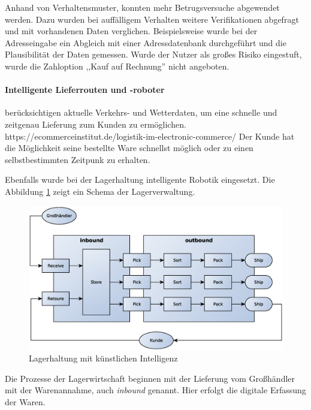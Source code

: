 Anhand von Verhaltensmuster, konnten mehr Betrugsversuche abgewendet werden. Dazu wurden bei auffälligem Verhalten weitere Verifikationen abgefragt und mit vorhandenen Daten verglichen. Beispielsweise wurde bei der Adresseingabe ein Abgleich mit einer Adressdatenbank durchgeführt und die Plausibilität der Daten gemessen. Wurde der Nutzer als großes Risiko eingestuft, wurde die Zahloption ,,Kauf auf Rechnung'' nicht angeboten.

\paragraph{Intelligente Lieferrouten und -roboter} berücksichtigen aktuelle Verkehrs- und Wetterdaten, um eine schnelle und zeitgenau Lieferung zum Kunden zu ermöglichen.
https://ecommerceinstitut.de/logistik-im-electronic-commerce/
Der Kunde hat die Möglichkeit seine bestellte Ware schnellst möglich oder zu einen selbstbestimmten Zeitpunk zu erhalten.\vspace{0.2cm}

Ebenfalls wurde bei der Lagerhaltung intelligente Robotik eingesetzt. Die Abbildung \ref{img:logistics_schema_in_e__commerce} zeigt ein Schema der Lagerverwaltung.

\begin{figure}[!ht]
	\centering
	\includegraphics[width=\linewidth]{images/logistics-ecommerce.eps}
	\caption{Lagerhaltung mit künstlichen Intelligenz}
	\label{img:logistics_schema_in_e__commerce}
\end{figure}

Die Prozesse der Lagerwirtschaft beginnen mit der Lieferung vom Großhändler mit der Warenannahme, auch \textit{inbound} genannt. Hier erfolgt die digitale Erfassung der Waren.\vspace{0.2cm}

